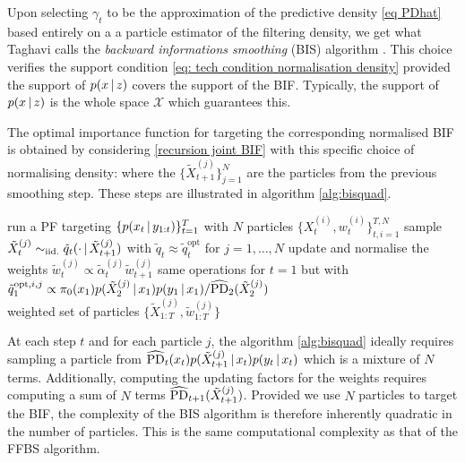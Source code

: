 Upon selecting $\gamma_{t}$ to be the approximation of the predictive density \eqref{eq PDhat} based entirely on a a particle estimator of the filtering density, we get what Taghavi calls the \emph{backward informations smoothing} (BIS) algorithm \citet{taghavi12}. This choice verifies the support condition \eqref{eq: tech condition normalisation density} provided the support  of $p(x\,|\, z)$ covers the support of the BIF. Typically, the support of $p(x\,|\, z)$ is the whole space $\mathcal X$ which guarantees this.

The optimal importance function for targeting the corresponding normalised BIF is obtained by considering \eqref{recursion joint BIF} with this specific choice of normalising density:
where the $\{\tilde X_{t+1}^{(j)}\}_{j=1}^{N}$ are the particles from the previous smoothing step. These steps are illustrated in algorithm \ref{alg:bisquad}.

%
\begin{algorithm}[!h]\small
	\caption{\label{alg:bisquad}}
	\begin{algorithmic}[1]
		\State run a PF targeting $\{p(x_{t}\,|\, y_{1:t})\}_{t=1}^{T}$ with $N$ particles $\{X^{(i)}_{t}, w^{(i)}_{t}\}_{t,i=1}^{T,N}$
			\State sample $\tilde X^{(j)}_{t}\sim_{\mathrm{iid.}} \tilde q_{t}(\cdot\,|\, \tilde X^{(j)}_{t+1})$ with $\tilde q_{t}\approx \tilde q_{t}^{\text{opt}}$ for $j=1,\dots,N$
			\State update and normalise the weights $\tilde w^{(j)}_{t}\propto \tilde\alpha^{(j)}_{t}\tilde w^{(j)}_{t+1}$
		\EndFor
		\State same operations for $t=1$ but with $\tilde q^{\text{opt},i,j}_{1} \propto \pi_{0}(x_{1})p(\tilde X^{(j)}_{2}\,|\, x_{1})p(y_{1}\,|\, x_{1})/\widehat{\text{PD}}_{2}(\tilde X^{(j)}_{2})$\\

		\Return weighted set of particles $\{\tilde X^{(j)}_{1:T}, \tilde w^{(j)}_{1:T}\}$
	\end{algorithmic}
\end{algorithm}
%

At each step $t$ and for each particle $j$, the algorithm \ref{alg:bisquad} ideally requires sampling a particle from $\widehat{\text{PD}}_{t}(x_{t})p(\tilde X^{(j)}_{t+1}\,|\, x_{t})p(y_{t}\,|\, x_{t})$ which is a mixture of $N$ terms. Additionally, computing the updating factors for the weights requires computing a sum of $N$ terms $\widehat{\text{PD}}_{t+1}(\tilde X_{t+1}^{(j)})$. Provided we use $N$ particles to target the BIF, the complexity of the BIS algorithm is therefore inherently quadratic in the number of particles. This is the same computational complexity as that of the FFBS algorithm.

